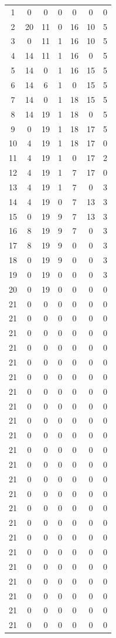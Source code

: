 \begin{longtable}{ccccccc}
1   & 0  & 0  & 0 & 0  & 0  & 0  \\
2   & 20 & 11 & 0 & 16 & 10 & 5  \\
3   & 0  & 11 & 1 & 16 & 10 & 5  \\
4   & 14 & 11 & 1 & 16 & 0  & 5  \\
5   & 14 & 0  & 1 & 16 & 15 & 5  \\
6   & 14 & 6  & 1 & 0  & 15 & 5  \\
7   & 14 & 0  & 1 & 18 & 15 & 5  \\
8   & 14 & 19 & 1 & 18 & 0  & 5  \\
9   & 0  & 19 & 1 & 18 & 17 & 5  \\
10  & 4  & 19 & 1 & 18 & 17 & 0  \\
11  & 4  & 19 & 1 & 0  & 17 & 2  \\
12 & 4  & 19 & 1 & 7  & 17 & 0  \\
13 & 4  & 19 & 1 & 7  & 0  & 3  \\
14 & 4  & 19 & 0 & 7  & 13 & 3  \\
15 & 0  & 19 & 9 & 7  & 13 & 3  \\
16 & 8  & 19 & 9 & 7  & 0  & 3  \\
17 & 8  & 19 & 9 & 0  & 0  & 3  \\
18 & 0  & 19 & 9 & 0  & 0  & 3  \\
19 & 0  & 19 & 0 & 0  & 0  & 3  \\
20 & 0  & 19 & 0 & 0  & 0  & 0  \\
21 & 0  & 0  & 0 & 0  & 0  & 0  \\
21 & 0  & 0  & 0 & 0  & 0  & 0  \\
21 & 0  & 0  & 0 & 0  & 0  & 0  \\
21 & 0  & 0  & 0 & 0  & 0  & 0  \\
21 & 0  & 0  & 0 & 0  & 0  & 0  \\
21 & 0  & 0  & 0 & 0  & 0  & 0  \\
21 & 0  & 0  & 0 & 0  & 0  & 0  \\
21 & 0  & 0  & 0 & 0  & 0  & 0  \\
21 & 0  & 0  & 0 & 0  & 0  & 0  \\
21 & 0  & 0  & 0 & 0  & 0  & 0  \\
21 & 0  & 0  & 0 & 0  & 0  & 0  \\
21 & 0  & 0  & 0 & 0  & 0  & 0  \\
21 & 0  & 0  & 0 & 0  & 0  & 0  \\
21 & 0  & 0  & 0 & 0  & 0  & 0  \\
21 & 0  & 0  & 0 & 0  & 0  & 0  \\
21 & 0  & 0  & 0 & 0  & 0  & 0  \\
21 & 0  & 0  & 0 & 0  & 0  & 0  \\
21 & 0  & 0  & 0 & 0  & 0  & 0  \\
21 & 0  & 0  & 0 & 0  & 0  & 0  \\
21 & 0  & 0  & 0 & 0  & 0  & 0  \\
21 & 0  & 0  & 0 & 0  & 0  & 0  \\
21 & 0  & 0  & 0 & 0  & 0  & 0  \\
21 & 0  & 0  & 0 & 0  & 0  & 0  \\
\end{longtable}

